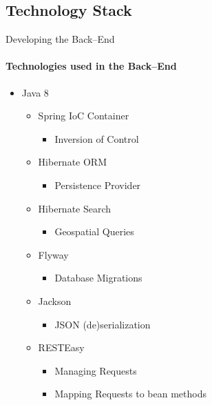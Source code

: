     \subsection{Technology Stack}
        \begin{frame}{Developing the Back--End}\framesubtitle{Technologies used in the Back--End}
             \begin{itemize}
                 \item Java 8
                 \begin{itemize}
                    \item Spring IoC Container
                    \begin{itemize}
                        \item Inversion of Control
                    \end{itemize}
                    \item Hibernate ORM
                    \begin{itemize}
                        \item Persistence Provider
                    \end{itemize}
                    \item Hibernate Search
                    \begin{itemize}
                        \item Geospatial Queries
                    \end{itemize}
                    \item Flyway
                    \begin{itemize}
                        \item Database Migrations
                    \end{itemize}
                    \item Jackson
                    \begin{itemize}
                        \item JSON (de)serialization 
                    \end{itemize}
                    \item RESTEasy
                    \begin{itemize}
                        \item Managing Requests
                        \item Mapping Requests to bean methods
                    \end{itemize}
                 \end{itemize}
             \end{itemize}
        \end{frame}
